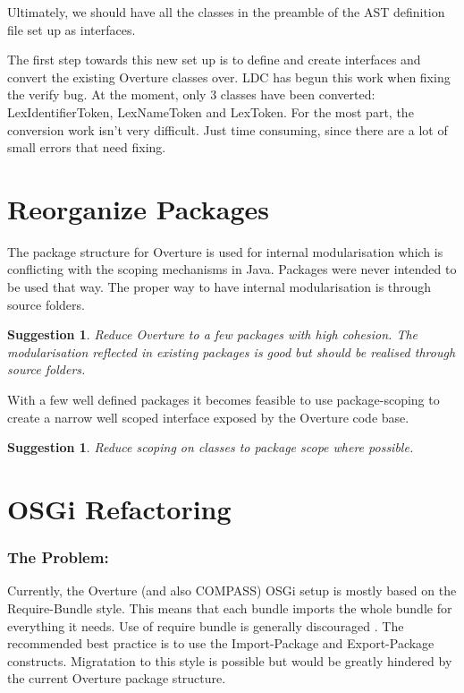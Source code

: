 \documentclass[11pt]{overturerep} \usepackage{t1enc,times,a4,t1enc}
\newtheorem{sug}[subsection]{Suggestion}
\begin{document}
    Ultimately, we should have all the classes in the preamble of the AST
    definition file set up as interfaces.

    The first step towards this new set up is to define and create interfaces
    and convert the existing Overture classes over. LDC has begun this work
    when fixing the verify bug. At the moment, only 3 classes have been
    converted: \textsf{LexIdentifierToken}, \textsf{LexNameToken} and
    \textsf{LexToken}. For the most part, the conversion work isn't very
    difficult. Just time consuming, since there are a lot of small errors that
    need fixing.
    
    



\section{Reorganize Packages} The package structure for Overture is used for
internal modularisation which is conflicting with the scoping mechanisms in
Java.  Packages were never intended to be used that way. The proper way to have
internal modularisation is through source folders.

\begin{sug} Reduce Overture to a few packages with high cohesion. The
modularisation reflected in existing packages is good but should be realised
through source folders.  \end{sug}

With a few well defined packages it becomes feasible to use package-scoping to
create a narrow well scoped interface exposed by the Overture code base.

\begin{sug} Reduce scoping on classes to package scope where possible.
\end{sug}




\section{OSGi Refactoring} \label{sec:osgi} 

    \subsubsection{The Problem:} Currently, the Overture (and also COMPASS)
    OSGi setup is mostly based on the \textsf{Require-Bundle} style. This means
    that each bundle imports the whole bundle for everything it needs. Use of
    require bundle is generally discouraged \cite{osgi2013}. The recommended
    best practice is to use the \textsf{Import-Package} and
    \textsf{Export-Package} constructs. Migratation to this style is possible
    but would be greatly hindered by the current Overture package structure.
\end{document}
